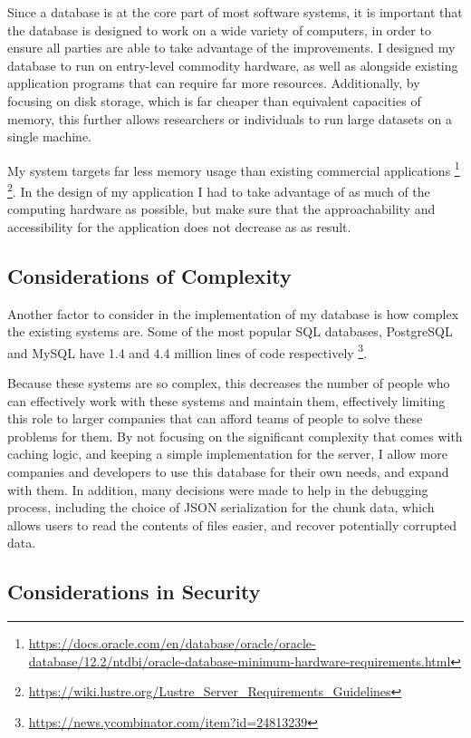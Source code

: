 \documentclass[10pt,twocolumn]{article}
\begin{document}
Since a database is at the core part of most software systems, it is important
that the database is designed to work on a wide variety of computers, in order
to ensure all parties are able to take advantage of the improvements. I
designed my database to run on entry-level commodity hardware, as well as
alongside existing application programs that can require far more resources.
Additionally, by focusing on disk storage, which is far cheaper than equivalent
capacities of memory, this further allows researchers or individuals to run
large datasets on a single machine.

My system targets far less memory usage than existing commercial applications
\footnote{\url{https://docs.oracle.com/en/database/oracle/oracle-database/12.2/ntdbi/oracle-database-minimum-hardware-requirements.html}}
\footnote{\url{https://wiki.lustre.org/Lustre_Server_Requirements_Guidelines}}.
In the design of my application I had to take advantage of as much of the
computing hardware as possible, but make sure that the approachability and
accessibility for the application does not decrease as as result.


\subsection{Considerations of Complexity}
Another factor to consider in the implementation of my database is how complex
the existing systems are. Some of the most popular SQL databases, PostgreSQL and
MySQL have 1.4 and 4.4 million lines of code respectively
\footnote{\url{https://news.ycombinator.com/item?id=24813239}}.

Because these systems are so complex, this decreases the number of people who
can effectively work with these systems and maintain them, effectively limiting
this role to larger companies that can afford teams of people to solve these
problems for them. By not focusing on the significant complexity that comes with
caching logic, and keeping a simple implementation for the server, I allow more
companies and developers to use this database for their own needs, and expand
with them. In addition, many decisions were made to help in the debugging
process, including the choice of JSON serialization for the chunk data, which
allows users to read the contents of files easier, and recover potentially
corrupted data.

\subsection{Considerations in Security}
\end{document}
